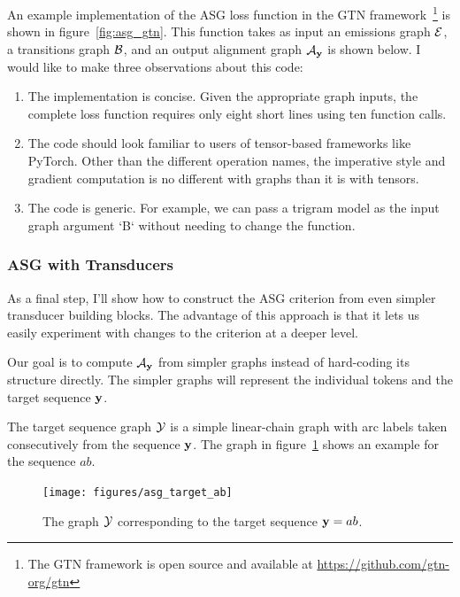 

An example implementation of the ASG loss function in the GTN
framework~\footnote{The GTN framework is open source and available at
\url{https://github.com/gtn-org/gtn}} is shown in figure~\ref{fig:asg_gtn}.
This function takes as input an emissions graph $\mathcal{E}$, a transitions graph
$\mathcal{B}$, and an output alignment graph $\mathcal{A}_{\bf y}$ is shown below. I would like to
make three observations about this code:

\begin{enumerate}
    \item The implementation is concise. Given the appropriate graph inputs,
        the complete loss function requires only eight short lines using ten
        function calls.

    \item The code should look familiar to users of tensor-based frameworks
        like PyTorch. Other than the different operation names, the imperative
        style and gradient computation is no different with graphs than it is
        with tensors.

    \item The code is generic. For example, we can pass a trigram model as the
        input graph argument `B` without needing to change the function.
\end{enumerate}

\subsubsection{ASG with Transducers}

As a final step, I'll show how to construct the ASG criterion from even simpler
transducer building blocks. The advantage of this approach is that it lets us
easily experiment with changes to the criterion at a deeper level.

Our goal is to compute $\mathcal{A}_{\bf y}$ from simpler graphs instead of hard-coding its
structure directly. The simpler graphs will represent the individual tokens and
the target sequence ${\bf y}$.

The target sequence graph $\mathcal{Y}$ is a simple linear-chain graph with arc labels
taken consecutively from the sequence ${\bf y}$. The graph in
figure~\ref{fig:asg_target_ab} shows an example for the sequence $ab$.

\begin{figure}
    \centering
    \texttt{[image: figures/asg\_target\_ab]}
    \caption{The graph $\mathcal{Y}$ corresponding to the target sequence ${\bf y} = ab$.}
    \label{fig:asg_target_ab}
\end{figure}

